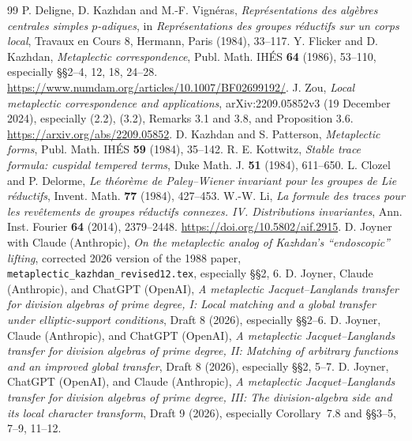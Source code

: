 \documentclass[11pt]{article}
\theoremstyle{plain}
\theoremstyle{definition}
\begin{document}
\begin{thebibliography}{99}
 P. Deligne, D. Kazhdan and M.-F. Vign\'eras,
\emph{Repr\'esentations des alg\`ebres centrales simples $p$-adiques},
in \emph{Repr\'esentations des groupes r\'eductifs sur un corps local},
Travaux en Cours 8, Hermann, Paris (1984), 33--117.
 Y. Flicker and D. Kazhdan,
\emph{Metaplectic correspondence}, Publ. Math. IH\'ES \textbf{64}
(1986), 53--110, especially \S\S2--4, 12, 18, 24--28.
\url{https://www.numdam.org/articles/10.1007/BF02699192/}.
 J. Zou,
\emph{Local metaplectic correspondence and applications},
arXiv:2209.05852v3 (19 December 2024), especially
(2.2), (3.2), Remarks 3.1 and 3.8, and Proposition 3.6.
\url{https://arxiv.org/abs/2209.05852}.
 D. Kazhdan and S. Patterson,
\emph{Metaplectic forms}, Publ. Math. IH\'ES \textbf{59}
(1984), 35--142.
 R. E. Kottwitz,
\emph{Stable trace formula: cuspidal tempered terms}, Duke Math. J.
\textbf{51} (1984), 611--650.
 L. Clozel and P. Delorme,
\emph{Le th\'eor\`eme de Paley--Wiener invariant pour les groupes de Lie
r\'eductifs}, Invent. Math. \textbf{77} (1984), 427--453.
 W.-W. Li,
\emph{La formule des traces pour les rev\^etements de groupes
r\'eductifs connexes. IV. Distributions invariantes},
Ann. Inst. Fourier \textbf{64} (2014), 2379--2448.
\url{https://doi.org/10.5802/aif.2915}.
 D. Joyner with Claude (Anthropic),
\emph{On the metaplectic analog of Kazhdan's ``endoscopic'' lifting},
corrected 2026 version of the 1988 paper,
\texttt{metaplectic\_kazhdan\_revised12.tex}, especially \S\S2, 6.
 D. Joyner, Claude (Anthropic), and ChatGPT (OpenAI),
\emph{A metaplectic Jacquet--Langlands transfer for division algebras
of prime degree, I: Local matching and a global transfer under
elliptic-support conditions}, Draft 8 (2026), especially \S\S2--6.
 D. Joyner, Claude (Anthropic), and ChatGPT (OpenAI),
\emph{A metaplectic Jacquet--Langlands transfer for division algebras
of prime degree, II: Matching of arbitrary functions and an improved
global transfer}, Draft 8 (2026), especially \S\S2, 5--7.
 D. Joyner, ChatGPT (OpenAI), and Claude (Anthropic),
\emph{A metaplectic Jacquet--Langlands transfer for division algebras
of prime degree, III: The division-algebra side and its local
character transform}, Draft 9 (2026), especially Corollary~7.8
and \S\S3--5, 7--9, 11--12.
\end{thebibliography}
\end{document}
